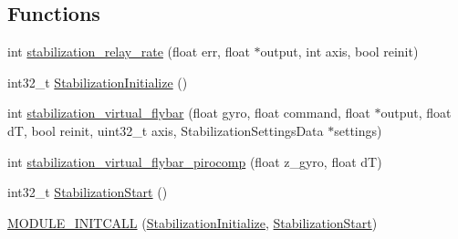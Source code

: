 \subsection*{\-Functions}
\begin{DoxyCompactItemize}
\item 
int \hyperlink{group___stabilization_module_gae98f3dcccca3bf2f6978a8f44529c14a}{stabilization\-\_\-relay\-\_\-rate} (float err, float $\ast$output, int axis, bool reinit)
\item 
int32\-\_\-t \hyperlink{group___stabilization_module_ga0271ad4d56816c408814d99db9d15b8b}{\-Stabilization\-Initialize} ()
\item 
int \hyperlink{group___stabilization_module_ga59f8ecdbf84bddb7072618a7de6e817e}{stabilization\-\_\-virtual\-\_\-flybar} (float gyro, float command, float $\ast$output, float d\-T, bool reinit, uint32\-\_\-t axis, \-Stabilization\-Settings\-Data $\ast$settings)
\item 
int \hyperlink{group___stabilization_module_ga286dd4b805297b12acd0aa9a69780a75}{stabilization\-\_\-virtual\-\_\-flybar\-\_\-pirocomp} (float z\-\_\-gyro, float d\-T)
\item 
int32\-\_\-t \hyperlink{group___stabilization_module_ga6190a7e200476bf20da7b47ac4107973}{\-Stabilization\-Start} ()
\item 
\hyperlink{group___stabilization_module_ga2ed12a01187d2c1f1659b1e9ee957d93}{\-M\-O\-D\-U\-L\-E\-\_\-\-I\-N\-I\-T\-C\-A\-L\-L} (\hyperlink{group___stabilization_module_ga0271ad4d56816c408814d99db9d15b8b}{\-Stabilization\-Initialize}, \hyperlink{group___stabilization_module_ga6190a7e200476bf20da7b47ac4107973}{\-Stabilization\-Start})
\end{DoxyCompactItemize}
